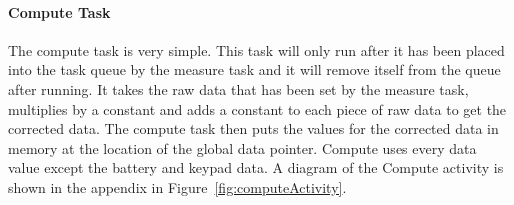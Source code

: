 \documentclass[12pt]{article} %
\begin{document}
    \paragraph{Compute Task} The compute task is very simple. This task will
    only run after it has been placed into the task queue by the measure task
    and it will remove itself from the queue after running. It takes the raw
    data that has been set by the measure task, multiplies by a constant and
    adds a constant to each piece of raw data to get the corrected data. The
    compute task then puts the values for the corrected data in memory at the
    location of the global data pointer. Compute uses every data value except
    the battery and keypad data. A diagram of the Compute activity is shown in
    the appendix in Figure~\ref{fig:computeActivity}.
\end{document}
